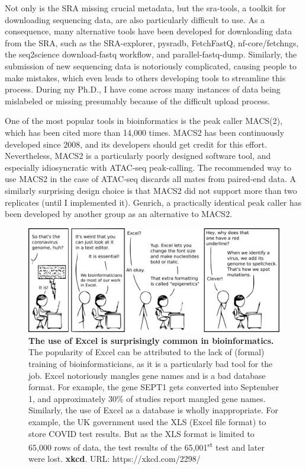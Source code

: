 Not only is the SRA missing crucial metadata, but the sra-tools, a toolkit for downloading sequencing data, are also particularly difficult to use. As a consequence, many alternative tools have been developed for downloading data from the SRA, such as the SRA-explorer\cite{sraexplorer}, pysradb\cite{pysradb}, FetchFastQ\cite{galvez2022metadata}, nf-core/fetchngs\cite{fetchngs}, the seq2science download-fastq workflow\cite{seq2science}, and parallel-fastq-dump\cite{parallelfastq}. Similarly, the submission of new sequencing data is notoriously complicated, causing people to make mistakes, which even leads to others developing tools to streamline this process\cite{Quiones2020}. During my Ph.D., I have come across many instances of data being mislabeled or missing presumably because of the difficult upload process.

One of the most popular tools in bioinformatics is the peak caller MACS(2), which has been cited more than 14,000 times\cite{Zhang2008}. MACS2 has been continuously developed since 2008, and its developers should get credit for this effort. Nevertheless, MACS2 is a particularly poorly designed software tool, and especially idiosyncratic with ATAC-seq peak-calling. The recommended way to use MACS2 in the case of ATAC-seq discards all mates from paired-end data. A similarly surprising design choice is that MACS2 did not support more than two replicates (until I implemented it). Genrich, a practically identical peak caller has been developed by another group as an alternative to MACS2\cite{Gaspar2018}.

\begin{figure}[H]
    \includegraphics[width=\linewidth]{ch.discussion/imgs/xkcd_excel.png}
    \caption{\textbf{The use of Excel is surprisingly common in bioinformatics.} The popularity of Excel can be attributed to the lack of (formal) training of bioinformaticians, as it is a particularly bad tool for the job. Excel notoriously mangles gene names\cite{Zeeberg2004} and is a bad database format. For example, the gene SEPT1 gets converted into September 1, and approximately $30\%$ of studies report mangled gene names\cite{Abeysooriya2021}. Similarly, the use of Excel as a database is wholly inappropriate. For example, the UK government used the XLS (Excel file format) to store COVID test results. But as the XLS format is limited to 65,000 rows of data, the test results of the 65,001\textsuperscript{st} test and later were lost\cite{bbc_excel}.
    \textbf{xkcd}. URL: https://xkcd.com/2298/}
    \label{fig:xkcd_excel}
\end{figure}

